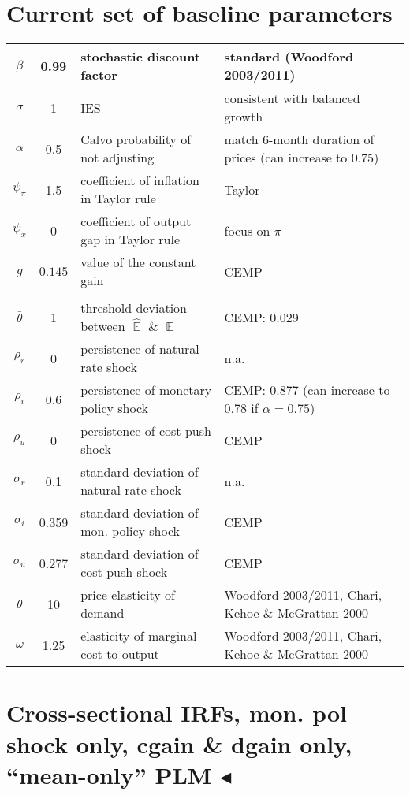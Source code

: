 \documentclass[11pt]{article}
\renewcommand{\[}{\begin{equation}}
\renewcommand{\]}{\end{equation}}
\DeclareMathOperator{\E}{\mathbb{E}}
\begin{document}
\section{Current set of baseline parameters}
\begin{tabular}{ c | c  | l | l}
 $\beta$ & 0.99 & stochastic discount factor & standard (Woodford 2003/2011) \\  \hline
 $\sigma$ & 1  & IES & consistent with balanced growth \\  \hline
 $\alpha$ & 0.5 &  Calvo probability of not adjusting  & match 6-month duration of prices (can increase to 0.75)\\\hline
 $\psi_{\pi} $& 1.5  & coefficient of inflation in Taylor rule & Taylor \\\hline
 $\psi_x$ & 0   & coefficient of output gap in Taylor rule  & focus on $\pi$\\\hline
 $\bar{g}$ & $0.145$  & value of the constant gain & CEMP \\\hline
& & \\ [-1em] %
 $\bar{\theta}$ &  1  & threshold deviation between $\hat{\E}$ \& $\E$ & CEMP: 0.029\\ \hline
    $\rho_r$ & 0 &   persistence of natural rate shock & n.a. \\ \hline
    $\rho_i$ & 0.6 &  persistence of monetary policy shock & CEMP: 0.877  (can increase to 0.78 if $\alpha=0.75$) \\ \hline
    $\rho_u$ & 0  &  persistence of cost-push shock  & CEMP\\ \hline
    $\sigma_r$ & 0.1 & standard deviation of natural rate shock & n.a. \\ \hline
    $\sigma_i$ &  0.359  &standard deviation of mon. policy shock & CEMP \\ \hline
    $\sigma_u$ & 0.277 & standard deviation of cost-push shock & CEMP  \\ \hline
    $\theta$ & 10 & price elasticity of demand &Woodford 2003/2011, Chari, Kehoe \& McGrattan 2000  \\ \hline
    $\omega$ & 1.25 & elasticity of marginal cost to output &Woodford 2003/2011,  Chari, Kehoe \& McGrattan 2000  \\ \hline
\end{tabular}

\newpage
\section{Cross-sectional IRFs, mon. pol shock only, cgain \& dgain only, ``mean-only'' PLM $\blacktriangleleft$}	
\end{document}
